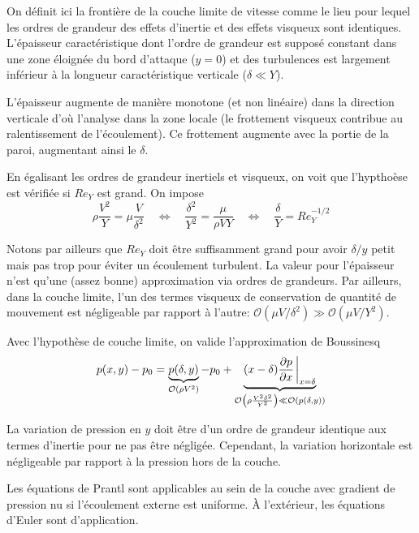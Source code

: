     On définit ici la frontière de la couche limite de vitesse comme le lieu pour lequel les ordres de grandeur des effets d'inertie et des effets visqueux sont identiques. L'épaisseur caractéristique dont l'ordre de grandeur est supposé constant dans une zone éloignée du bord d'attaque ($y=0$) et des turbulences est largement inférieur à la longueur caractéristique verticale ($\delta \ll Y$).

    L'épaisseur augmente de manière monotone (et non linéaire) dans la direction verticale d'où l'analyse dans la zone locale (le frottement visqueux contribue au ralentissement de l'écoulement). Ce frottement augmente avec la portie de la paroi, augmentant ainsi le $\delta$.

    En égalisant les ordres de grandeur inertiels et visqueux, on voit que l'hypthoèse est vérifiée si $Re_Y$ est grand. On impose
    \begin{equation}
      \rho \frac{V^2}{Y} = \mu \frac{V}{\delta^2} \quad \Leftrightarrow \quad \frac{\delta^2}{Y^2} = \frac{\mu}{\rho V Y} \quad \Leftrightarrow \quad \frac{\delta}{Y} = Re_Y^{-1/2}
    \end{equation}

    Notons par ailleurs que $Re_Y$ doit être suffisamment grand pour avoir $\delta/y$ petit mais pas trop pour éviter un écoulement turbulent. La valeur pour l'épaisseur n'est qu'une (assez bonne) approximation via ordres de grandeurs. Par ailleurs, dans la couche limite, l'un des termes visqueux de conservation de quantité de mouvement est négligeable par rapport à l'autre: $\mathcal{O}(\mu V/\delta^2) \gg \mathcal{O}(\mu V/Y^2)$.

    Avec l'hypothèse de couche limite, on valide l'approximation de Boussinesq
    \begin{equation}
      p(x,y) - p_0 = \underbrace{p(\delta, y)}_{\mathcal{O}(\rho V^2)} - p_0 + \underbrace{(x-\delta) \pdv{p}{x}\eval_{x=\delta}}_{\mathcal{O}\left(\rho\frac{V^2\delta^2}{Y^2}\right) \ll \mathcal{O}(p(\delta,y))}
    \end{equation}

    La variation de pression en $y$ doit être d'un ordre de grandeur identique aux termes d'inertie pour ne pas être négligée. Cependant, la variation horizontale est négligeable par rapport à la pression hors de la couche.

    Les équations de Prantl sont applicables au sein de la couche avec gradient de pression nu si l'écoulement externe est uniforme. À l'extérieur, les équations d'Euler sont d'application.

